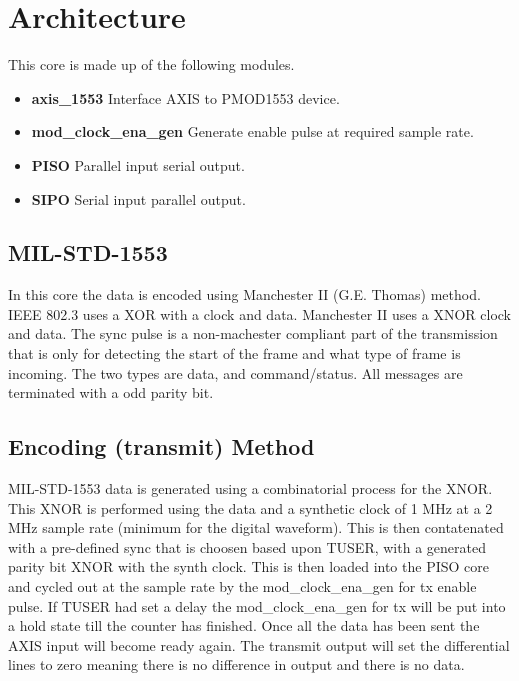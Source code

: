 \section{Architecture}
\par
This core is made up of the following modules.
\begin{itemize} 
  \item \textbf{axis\_1553} Interface AXIS to PMOD1553 device.
  \item \textbf{mod\_clock\_ena\_gen} Generate enable pulse at required sample rate.
  \item \textbf{PISO} Parallel input serial output.
  \item \textbf{SIPO} Serial input parallel output.
\end{itemize}

\subsection{MIL-STD-1553}
\par
In this core the data is encoded using Manchester II (G.E. Thomas) method. IEEE 802.3 uses a XOR with a clock and data. Manchester II uses a XNOR clock and data. The sync pulse is a non-machester compliant
part of the transmission that is only for detecting the start of the frame and what type of frame is incoming. The two types are data, and command/status. All messages are terminated with a odd parity bit.

\subsection{Encoding (transmit) Method}
\par
MIL-STD-1553 data is generated using a combinatorial process for the XNOR. This XNOR is performed using the data and a synthetic clock of 1 MHz at a 2 MHz sample rate (minimum for the digital waveform).
This is then contatenated with a pre-defined sync that is choosen based upon TUSER, with a generated parity bit XNOR with the synth clock. This is then loaded into the PISO core and cycled out at the sample
rate by the mod\_clock\_ena\_gen for tx enable pulse. If TUSER had set a delay the mod\_clock\_ena\_gen for tx will be put into a hold state till the counter has finished. Once all the data has been sent the
AXIS input will become ready again. The transmit output will set the differential lines to zero meaning there is no difference in output and there is no data.

